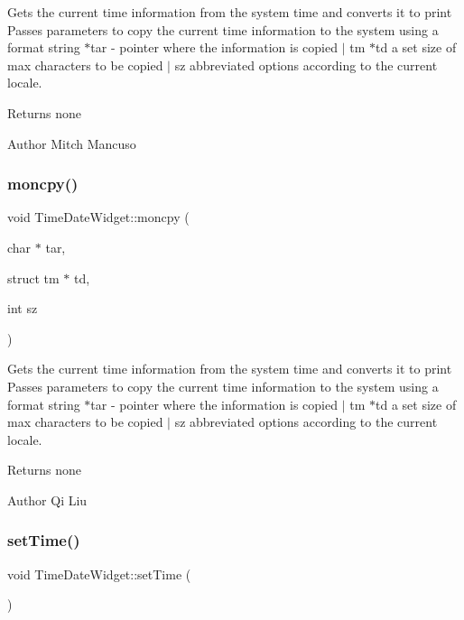 Gets the current time information from the system time and converts it to print  Passes parameters to copy the current time information to the system using a format string  $\ast$tar -\/ pointer where the information is copied $\vert$ tm $\ast$td a set size of max characters to be copied $\vert$ sz abbreviated options according to the current locale. 

\begin{DoxyReturn}{Returns}
none 
\end{DoxyReturn}
\begin{DoxyAuthor}{Author}
Mitch Mancuso 
\end{DoxyAuthor}
\mbox{\label{class_time_date_widget_a48922ee8b0b5ffdddbf1f88183ca681a}} 
\subsubsection{\texorpdfstring{moncpy()}{moncpy()}}
{\footnotesize\ttfamily void Time\+Date\+Widget\+::moncpy (\begin{DoxyParamCaption}\item[{char $\ast$}]{tar,  }\item[{struct tm $\ast$}]{td,  }\item[{int}]{sz }\end{DoxyParamCaption})}



Gets the current time information from the system time and converts it to print  Passes parameters to copy the current time information to the system using a format string  $\ast$tar -\/ pointer where the information is copied $\vert$ tm $\ast$td a set size of max characters to be copied $\vert$ sz abbreviated options according to the current locale. 

\begin{DoxyReturn}{Returns}
none 
\end{DoxyReturn}
\begin{DoxyAuthor}{Author}
Qi Liu 
\end{DoxyAuthor}
\mbox{\label{class_time_date_widget_abe51a4c778e6351c171067a4706d01d1}} 
\subsubsection{\texorpdfstring{set\+Time()}{setTime()}}
{\footnotesize\ttfamily void Time\+Date\+Widget\+::set\+Time (\begin{DoxyParamCaption}{ }\end{DoxyParamCaption})}



